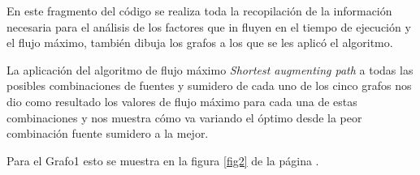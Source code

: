 \documentclass{article}
\begin{document}
En este fragmento del código se realiza toda la recopilación de la información necesaria para el análisis de los factores que in fluyen en el tiempo de ejecución y el flujo máximo, también dibuja los grafos a los que se les aplicó el algoritmo. 
\begin{center}

\end{center}
La aplicación del algoritmo de flujo máximo \textit{Shortest augmenting path} a todas las posibles combinaciones de fuentes y sumidero de cada uno de los cinco grafos nos dio como resultado los valores de flujo máximo para cada una de estas combinaciones y nos muestra cómo va variando el óptimo desde la peor combinación fuente sumidero a la mejor.

Para el Grafo1 esto se muestra en la figura \ref{fig2} de la página \pageref{fig2}.
\end{document}
